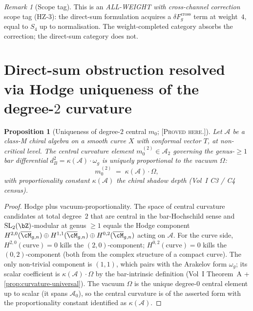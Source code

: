 \documentclass[11pt]{amsart}
\newtheorem{proposition}[theorem]{Proposition}
\theoremstyle{definition}
\theoremstyle{remark}
\newtheorem{remark}[theorem]{Remark}
\providecommand{\cA}{\mathcal{A}}
\providecommand{\ClaimStatusProvedHere}{\textsc{[Proved here.]}}
\begin{document}
\begin{remark}[Scope tag]%
\label{rem:direct-sum-scope-tag}%
This is an \emph{ALL-WEIGHT with cross-channel correction} scope tag
(HZ-3): the direct-sum formulation acquires a
$\delta F_g^{\mathrm{cross}}$ term at weight~$4$, equal to
$S_4$ up to normalisation. The weight-completed category absorbs the
correction; the direct-sum category does not.
\end{remark}

\section{Direct-sum obstruction resolved via Hodge uniqueness of the degree-$2$ curvature}
\label{sec:direct-sum-obstruction-resolution}

\begin{proposition}[Uniqueness of degree-$2$ central $m_0$;
\ClaimStatusProvedHere]%
\label{prop:direct-sum-obstruction-resolution}%
Let $\cA$ be a class-M chiral algebra on a smooth curve $X$ with
conformal vector $T$, at non-critical level. The central curvature
element $m_0^{(2)} \in \cA_2$ governing the genus-$\ge 1$ bar
differential $d_B^2 = \kappa(\cA) \cdot \omega_g$ is uniquely
proportional to the vacuum $\Omega$:
\[
  m_0^{(2)} \;=\; \kappa(\cA) \cdot \Omega,
\]
with proportionality constant $\kappa(\cA)$ the chiral shadow depth
(Vol~I C3 / C4 census).
\end{proposition}

\begin{proof}
Hodge plus vacuum-proportionality. The space of central
curvature candidates at total degree~$2$ that are central in the
bar-Hochschild sense and $\mathrm{SL}_2(\bZ)$-modular at genus $\ge
1$ equals the Hodge component
$H^{2,0}(\overline{\cM}_{g,n}) \oplus H^{1,1}(\overline{\cM}_{g,n})
\oplus H^{0,2}(\overline{\cM}_{g,n})$ acting
on $\cA$. For the curve side, $H^{2,0}(\mathrm{curve}) = 0$ kills
the $(2,0)$-component; $H^{0,2}(\mathrm{curve}) = 0$ kills the
$(0,2)$-component (both from the complex structure of a compact
curve). The only non-trivial component is $(1,1)$, which pairs with
the Arakelov form $\omega_g$; its scalar coefficient is
$\kappa(\cA) \cdot \Omega$ by the bar-intrinsic definition
(Vol~I Theorem~A + \ref*{prop:curvature-universal}). The vacuum
$\Omega$ is the unique degree-$0$ central element up to scalar (it
spans $\cA_0$), so the central curvature is of the asserted form
with the proportionality constant identified as $\kappa(\cA)$.
\end{proof}
\end{document}
